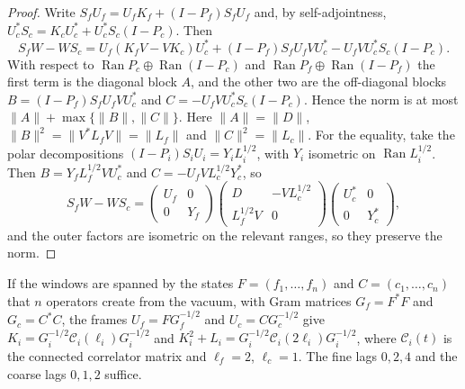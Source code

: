 \documentclass[11pt]{article}
\theoremstyle{remark}
\newcommand{\Ran}{\operatorname{Ran}}
\begin{document}
\begin{proof}
Write $S_fU_f=U_fK_f+(I-P_f)S_fU_f$ and, by self-adjointness, $U_c^*S_c=K_cU_c^*+U_c^*S_c(I-P_c)$. Then
\[
 S_fW-WS_c=U_f(K_fV-VK_c)U_c^*+(I-P_f)S_fU_fVU_c^*-U_fVU_c^*S_c(I-P_c) .
\]
With respect to $\Ran P_c\oplus\Ran(I-P_c)$ and $\Ran P_f\oplus\Ran(I-P_f)$ the first term is the diagonal block $A$, and the other two are the off-diagonal blocks $B=(I-P_f)S_fU_fVU_c^*$ and $C=-U_fVU_c^*S_c(I-P_c)$. Hence the norm is at most $\|A\|+\max\{\|B\|,\|C\|\}$. Here $\|A\|=\|D\|$, $\|B\|^2=\|V^*L_fV\|=\|L_f\|$ and $\|C\|^2=\|L_c\|$. For the equality, take the polar decompositions $(I-P_i)S_iU_i=Y_iL_i^{1/2}$, with $Y_i$ isometric on $\Ran L_i^{1/2}$. Then $B=Y_fL_f^{1/2}VU_c^*$ and $C=-U_fVL_c^{1/2}Y_c^*$, so
\[
 S_fW-WS_c=\begin{pmatrix}U_f&0\\0&Y_f\end{pmatrix}\begin{pmatrix}D&-VL_c^{1/2}\\ L_f^{1/2}V&0\end{pmatrix}\begin{pmatrix}U_c^*&0\\0&Y_c^*\end{pmatrix},
\]
and the outer factors are isometric on the relevant ranges, so they preserve the norm.
\end{proof}

If the windows are spanned by the states $F=(f_1,\dots,f_n)$ and $C=(c_1,\dots,c_n)$ that $n$ operators create from the vacuum, with Gram matrices $G_f=F^*F$ and $G_c=C^*C$, the frames $U_f=FG_f^{-1/2}$ and $U_c=CG_c^{-1/2}$ give $K_i=G_i^{-1/2}\mathcal C_i(\ell_i)G_i^{-1/2}$ and $K_i^2+L_i=G_i^{-1/2}\mathcal C_i(2\ell_i)G_i^{-1/2}$, where $\mathcal C_i(t)$ is the connected correlator matrix and $\ell_f=2$, $\ell_c=1$. The fine lags $0,2,4$ and the coarse lags $0,1,2$ suffice.
\end{document}
